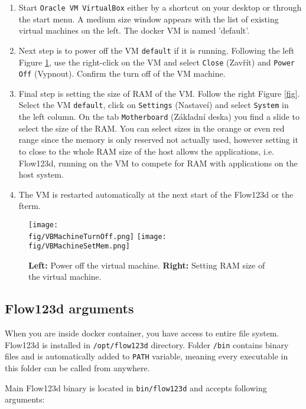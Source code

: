 \documentclass[12pt,a4paper]{report}
\def\fig{figures}
\begin{document}
 
\begin{enumerate}
 \item Start \verb'Oracle VM VirtualBox' either by a shortcut on your desktop or through the start menu. 
 A medium size window appears with the list of existing virtual machines 
 on the left. The docker VM is named 'default'.
 \item Next step is to power off the VM \verb'default' if it is running. 
 Following the left Figure \ref{fig:vm_ram_setup}, use the right-click on the VM and select \verb'Close' (Zav\v r\' it) and 
 \verb'Power Off' (Vypnout). Confirm the turn off of the VM machine. 
 \item Final step is setting the size of RAM of the VM. Follow the right Figure \ref{fig}. 
 Select the VM \verb'default', click on \verb'Settings' (Nastave\' i) and select \verb'System' in the left column.
 On the tab \verb'Motherboard' (Z\' akladn\' i deska) you find a slide to select the size of the RAM. You can select sizes  
 in the orange or even red range since the memory is only reserved not actually used, however setting it to close to the 
 whole RAM size of the host allows the applications, i.e. Flow123d, running on the VM to compete for RAM with applications on the host system.
 \item The VM is restarted automatically at the next start of the Flow123d or the fterm.
\end{enumerate}


\begin{figure}
    \center  
    \texttt{[image: \\fig/VBMachineTurnOff.png]}
    \hspace{2ex}
    \texttt{[image: \\fig/VBMachineSetMem.png]}
    \caption{{\bf Left:} Power off the virtual machine.
             {\bf Right:} Setting RAM size of the virtual machine.} 
    \label{fig:vm_ram_setup}
\end{figure}

\subsection{Flow123d arguments}
When you are inside docker container, you have access to entire file system. Flow123d is installed in 
\verb'/opt/flow123d' directory. Folder \verb'/bin' contains binary files and is automatically 
added to \verb'PATH' variable, meaning every executable in this folder can be called from anywhere.

Main Flow123d binary is located in \verb'bin/flow123d' and accepts following arguments:
\end{document}
